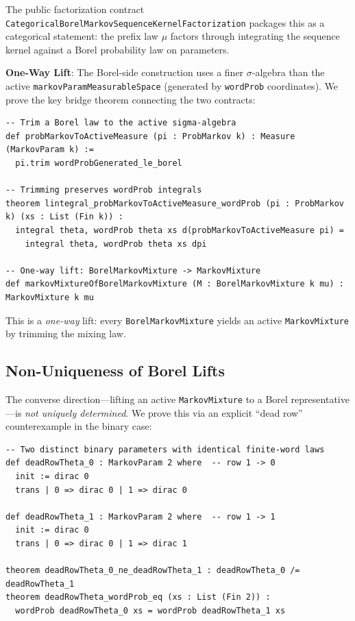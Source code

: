 \documentclass[11pt,a4paper]{article}
\theoremstyle{definition}
\begin{document}
The public factorization contract \texttt{CategoricalBorelMarkovSequenceKernelFactorization}
packages this as a categorical statement: the prefix law $\mu$ factors through
integrating the sequence kernel against a Borel probability law on parameters.

\textbf{One-Way Lift}: The Borel-side construction uses a finer $\sigma$-algebra
than the active \texttt{markovParamMeasurableSpace} (generated by \texttt{wordProb}
coordinates). We prove the key bridge theorem connecting the two contracts:

\begin{lstlisting}
-- Trim a Borel law to the active sigma-algebra
def probMarkovToActiveMeasure (pi : ProbMarkov k) : Measure (MarkovParam k) :=
  pi.trim wordProbGenerated_le_borel

-- Trimming preserves wordProb integrals
theorem lintegral_probMarkovToActiveMeasure_wordProb (pi : ProbMarkov k) (xs : List (Fin k)) :
  integral theta, wordProb theta xs d(probMarkovToActiveMeasure pi) =
    integral theta, wordProb theta xs dpi

-- One-way lift: BorelMarkovMixture -> MarkovMixture
def markovMixtureOfBorelMarkovMixture (M : BorelMarkovMixture k mu) : MarkovMixture k mu
\end{lstlisting}

This is a \emph{one-way} lift: every \texttt{BorelMarkovMixture} yields an active
\texttt{MarkovMixture} by trimming the mixing law.

\subsection{Non-Uniqueness of Borel Lifts}

The converse direction---lifting an active \texttt{MarkovMixture} to a Borel
representative---is \emph{not uniquely determined}. We prove this via an explicit
``dead row'' counterexample in the binary case:

\begin{lstlisting}
-- Two distinct binary parameters with identical finite-word laws
def deadRowTheta_0 : MarkovParam 2 where  -- row 1 -> 0
  init := dirac 0
  trans | 0 => dirac 0 | 1 => dirac 0

def deadRowTheta_1 : MarkovParam 2 where  -- row 1 -> 1
  init := dirac 0
  trans | 0 => dirac 0 | 1 => dirac 1

theorem deadRowTheta_0_ne_deadRowTheta_1 : deadRowTheta_0 /= deadRowTheta_1
theorem deadRowTheta_wordProb_eq (xs : List (Fin 2)) :
  wordProb deadRowTheta_0 xs = wordProb deadRowTheta_1 xs
\end{lstlisting}
\end{document}
